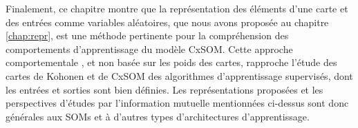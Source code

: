 \documentclass[../main]{subfiles}
\begin{document}
Finalement, ce chapitre montre que la représentation des éléments d'une carte et des entrées comme variables aléatoires, que nous avons proposée au chapitre \ref{chap:repr}, est une méthode pertinente pour la compréhension des comportements d'apprentissage du modèle CxSOM.
Cette approche \og comportementale \fg{}, et non basée sur les poids des cartes, rapproche l'étude des cartes de Kohonen et de CxSOM des algorithmes d'apprentissage supervisés, dont les entrées et sorties sont bien définies.
Les représentations proposées et les perspectives d'études par l'information mutuelle mentionnées ci-dessus sont donc générales aux SOMs et à d'autres types d'architectures d'apprentissage. 

\ifSubfilesClassLoaded{
    \printbibliography
}{}
\end{document}
